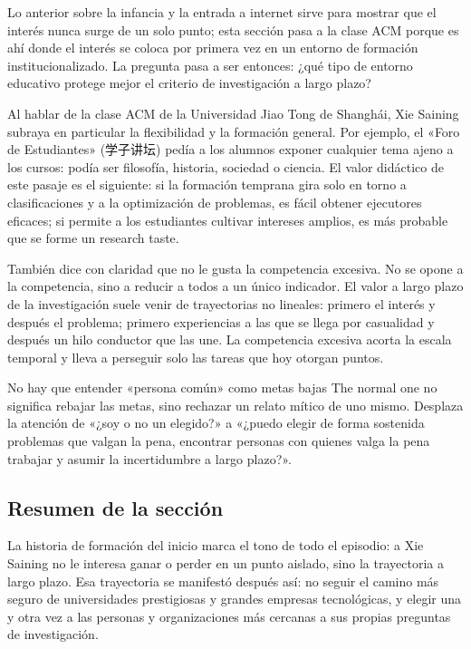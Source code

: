 Lo anterior sobre la infancia y la entrada a internet sirve para mostrar que el interés nunca surge de un solo punto; esta sección pasa a la clase ACM porque es ahí donde el interés se coloca por primera vez en un entorno de formación institucionalizado. La pregunta pasa a ser entonces: ¿qué tipo de entorno educativo protege mejor el criterio de investigación a largo plazo?

Al hablar de la clase ACM de la Universidad Jiao Tong de Shanghái, Xie Saining subraya en particular la flexibilidad y la formación general. Por ejemplo, el «Foro de Estudiantes» (学子讲坛) pedía a los alumnos exponer cualquier tema ajeno a los cursos: podía ser filosofía, historia, sociedad o ciencia. El valor didáctico de este pasaje es el siguiente: si la formación temprana gira solo en torno a clasificaciones y a la optimización de problemas, es fácil obtener ejecutores eficaces; si permite a los estudiantes cultivar intereses amplios, es más probable que se forme un research taste.

También dice con claridad que no le gusta la competencia excesiva. No se opone a la competencia, sino a reducir a todos a un único indicador. El valor a largo plazo de la investigación suele venir de trayectorias no lineales: primero el interés y después el problema; primero experiencias a las que se llega por casualidad y después un hilo conductor que las une. La competencia excesiva acorta la escala temporal y lleva a perseguir solo las tareas que hoy otorgan puntos.

\begin{warningbox}{No hay que entender «persona común» como metas bajas}
The normal one no significa rebajar las metas, sino rechazar un relato mítico de uno mismo. Desplaza la atención de «¿soy o no un elegido?» a «¿puedo elegir de forma sostenida problemas que valgan la pena, encontrar personas con quienes valga la pena trabajar y asumir la incertidumbre a largo plazo?».
\end{warningbox}

\subsection{Resumen de la sección}

La historia de formación del inicio marca el tono de todo el episodio: a Xie Saining no le interesa ganar o perder en un punto aislado, sino la trayectoria a largo plazo. Esa trayectoria se manifestó después así: no seguir el camino más seguro de universidades prestigiosas y grandes empresas tecnológicas, y elegir una y otra vez a las personas y organizaciones más cercanas a sus propias preguntas de investigación.
